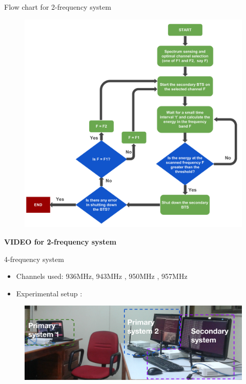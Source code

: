 \documentclass{beamer}
\begin{document}
  \begin{frame}{Flow chart for 2-frequency system}
    \begin{figure}
      \centering
      \includegraphics[height=0.9\textheight]{img/freqSys2}
    \end{figure}
  \end{frame}

  \begin{frame}[c]
    \begin{center}
      \LARGE \textbf{VIDEO for 2-frequency system}
    \end{center}
  \end{frame}


  
  \begin{frame}{4-frequency system}
    \begin{itemize}
      \item Channels used: 936MHz, 943MHz , 950MHz , 957MHz
      \item Experimental setup :
    \end{itemize}
    \begin{figure}
      \centering
      \includegraphics[width=0.97\linewidth]{img/freq4}
    \end{figure}
  \end{frame}
  
\end{document}
